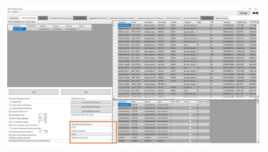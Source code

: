 \begin{itemize}
\begin{figure}[h]
\includegraphics[scale=0.42]{figures/theoretical3.jpg}
\end{figure}
\end{itemize}
